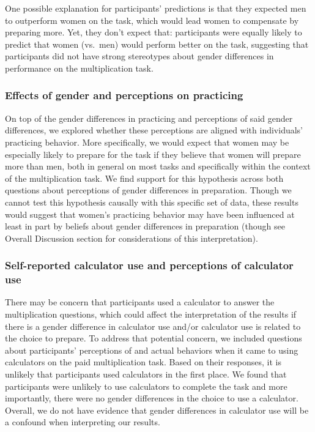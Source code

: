 \documentclass[letterpaper, nobind]{templates/ociamthesis}
\begin{document}
One possible explanation for participants' predictions is that they expected men to outperform women on the task, which would lead women to compensate by preparing more. Yet, they don't expect that: participants were equally likely to predict that women (vs.~men) would perform better on the task, suggesting that participants did not have strong stereotypes about gender differences in performance on the multiplication task.

\hypertarget{effects-of-gender-and-perceptions-on-practicing-1}{%
\subsubsection{Effects of gender and perceptions on practicing}\label{effects-of-gender-and-perceptions-on-practicing-1}}

On top of the gender differences in practicing and perceptions of said gender differences, we explored whether these perceptions are aligned with individuals' practicing behavior. More specifically, we would expect that women may be especially likely to prepare for the task if they believe that women will prepare more than men, both in general on most tasks and specifically within the context of the multiplication task. We find support for this hypothesis across both questions about perceptions of gender differences in preparation. Though we cannot test this hypothesis causally with this specific set of data, these results would suggest that women's practicing behavior may have been influenced at least in part by beliefs about gender differences in preparation (though see Overall Discussion section for considerations of this interpretation).

\hypertarget{self-reported-calculator-use-and-perceptions-of-calculator-use}{%
\subsubsection{Self-reported calculator use and perceptions of calculator use}\label{self-reported-calculator-use-and-perceptions-of-calculator-use}}

There may be concern that participants used a calculator to answer the multiplication questions, which could affect the interpretation of the results if there is a gender difference in calculator use and/or calculator use is related to the choice to prepare. To address that potential concern, we included questions about participants' perceptions of and actual behaviors when it came to using calculators on the paid multiplication task. Based on their responses, it is unlikely that participants used calculators in the first place. We found that participants were unlikely to use calculators to complete the task and more importantly, there were no gender differences in the choice to use a calculator. Overall, we do not have evidence that gender differences in calculator use will be a confound when interpreting our results.
\end{document}
